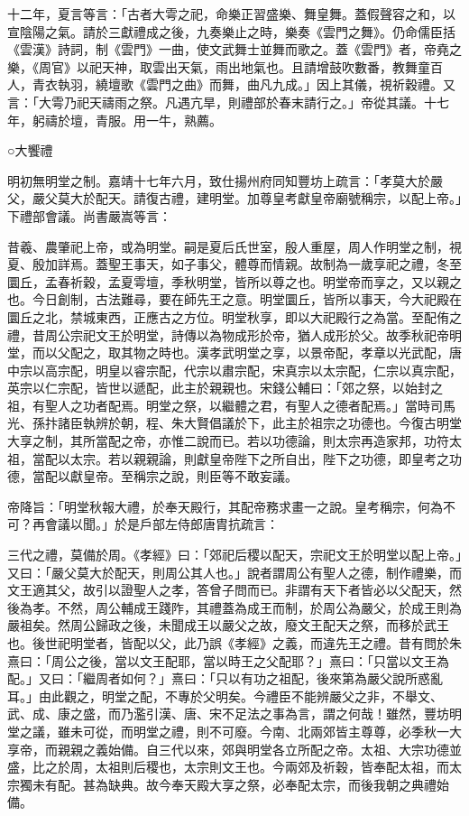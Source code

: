 十二年，夏言等言：「古者大雩之祀，命樂正習盛樂、舞皇舞。蓋假聲容之和，以宣陰陽之氣。請於三獻禮成之後，九奏樂止之時，樂奏《雲門之舞》。仍命儒臣括《雲漢》詩詞，制《雲門》一曲，使文武舞士並舞而歌之。蓋《雲門》者，帝堯之樂，《周官》以祀天神，取雲出天氣，雨出地氣也。且請增鼓吹數番，教舞童百人，青衣執羽，繞壇歌《雲門之曲》而舞，曲凡九成。」因上其儀，視祈穀禮。又言：「大雩乃祀天禱雨之祭。凡遇亢旱，則禮部於春末請行之。」帝從其議。十七年，躬禱於壇，青服。用一牛，熟薦。

○大饗禮

明初無明堂之制。嘉靖十七年六月，致仕揚州府同知豐坊上疏言：「孝莫大於嚴父，嚴父莫大於配天。請復古禮，建明堂。加尊皇考獻皇帝廟號稱宗，以配上帝。」下禮部會議。尚書嚴嵩等言：

昔羲、農肇祀上帝，或為明堂。嗣是夏后氏世室，殷人重屋，周人作明堂之制，視夏、殷加詳焉。蓋聖王事天，如子事父，體尊而情親。故制為一歲享祀之禮，冬至圜丘，孟春祈穀，孟夏雩壇，季秋明堂，皆所以尊之也。明堂帝而享之，又以親之也。今日創制，古法難尋，要在師先王之意。明堂圜丘，皆所以事天，今大祀殿在圜丘之北，禁城東西，正應古之方位。明堂秋享，即以大祀殿行之為當。至配侑之禮，昔周公宗祀文王於明堂，詩傳以為物成形於帝，猶人成形於父。故季秋祀帝明堂，而以父配之，取其物之時也。漢孝武明堂之享，以景帝配，孝章以光武配，唐中宗以高宗配，明皇以睿宗配，代宗以肅宗配，宋真宗以太宗配，仁宗以真宗配，英宗以仁宗配，皆世以遞配，此主於親親也。宋錢公輔曰：「郊之祭，以始封之祖，有聖人之功者配焉。明堂之祭，以繼體之君，有聖人之德者配焉。」當時司馬光、孫抃諸臣執辨於朝，程、朱大賢倡議於下，此主於祖宗之功德也。今復古明堂大享之制，其所當配之帝，亦惟二說而已。若以功德論，則太宗再造家邦，功符太祖，當配以太宗。若以親親論，則獻皇帝陛下之所自出，陛下之功德，即皇考之功德，當配以獻皇帝。至稱宗之說，則臣等不敢妄議。

帝降旨：「明堂秋報大禮，於奉天殿行，其配帝務求畫一之說。皇考稱宗，何為不可？再會議以聞。」於是戶部左侍郎唐胄抗疏言：

三代之禮，莫備於周。《孝經》曰：「郊祀后稷以配天，宗祀文王於明堂以配上帝。」又曰：「嚴父莫大於配天，則周公其人也。」說者謂周公有聖人之德，制作禮樂，而文王適其父，故引以證聖人之孝，答曾子問而已。非謂有天下者皆必以父配天，然後為孝。不然，周公輔成王踐阼，其禮蓋為成王而制，於周公為嚴父，於成王則為嚴祖矣。然周公歸政之後，未聞成王以嚴父之故，廢文王配天之祭，而移於武王也。後世祀明堂者，皆配以父，此乃誤《孝經》之義，而違先王之禮。昔有問於朱熹曰：「周公之後，當以文王配耶，當以時王之父配耶？」熹曰：「只當以文王為配。」又曰：「繼周者如何？」熹曰：「只以有功之祖配，後來第為嚴父說所惑亂耳。」由此觀之，明堂之配，不專於父明矣。今禮臣不能辨嚴父之非，不舉文、武、成、康之盛，而乃濫引漢、唐、宋不足法之事為言，謂之何哉！雖然，豐坊明堂之議，雖未可從，而明堂之禮，則不可廢。今南、北兩郊皆主尊尊，必季秋一大享帝，而親親之義始備。自三代以來，郊與明堂各立所配之帝。太祖、大宗功德並盛，比之於周，太祖則后稷也，太宗則文王也。今兩郊及祈穀，皆奉配太祖，而太宗獨未有配。甚為缺典。故今奉天殿大享之祭，必奉配太宗，而後我朝之典禮始備。

